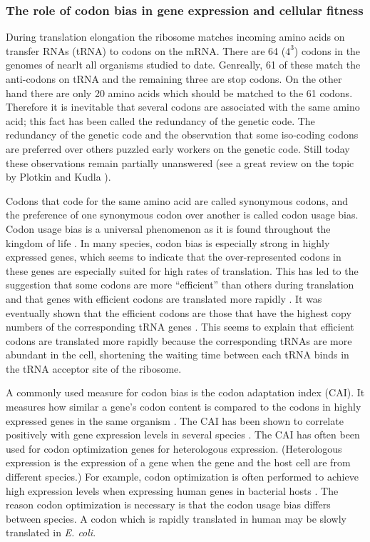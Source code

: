 \subsubsection{The role of codon bias in gene expression and cellular fitness}
During translation elongation the ribosome matches incoming amino acids on
transfer RNAs (tRNA) to codons on the mRNA. There are 64 ($4^3$) codons in the
genomes of nearlt all organisms studied to date. Genreally, 61 of these match
the anti-codons on tRNA and the remaining three are stop codons. On the other
hand there are only 20 amino acids which should be matched to the 61 codons.
Therefore it is inevitable that several codons are associated with the same
amino acid; this fact has been called the redundancy of the genetic code. The
redundancy of the genetic code and the observation that some iso-coding codons
are preferred over others puzzled early workers on the genetic code. Still
today these observations remain partially unanswered (see a great review on the
topic by Plotkin and Kudla \cite{plotkin_synonymous_2011}).

Codons that code for the same amino acid are called synonymous codons, and the
preference of one synonymous codon over another is called codon usage bias.
Codon usage bias is a universal phenomenon as it is found throughout the
kingdom of life \cite{sharp_codon_1988}. In many species, codon bias is
especially strong in highly expressed genes, which seems to indicate that the
over-represented codons in these genes are especially suited for high rates of
translation.  This has led to the suggestion that some codons are more
``efficient'' than others during translation and that genes with efficient
codons are translated more rapidly \cite{moriyama_gene_1998}. It was eventually
shown that the efficient codons are those that have the highest copy numbers of
the corresponding tRNA genes \cite{reis_solving_2004, elf_selective_2003}. This
seems to explain that efficient codons are translated more rapidly because the
corresponding tRNAs are more abundant in the cell, shortening the waiting time
between each tRNA binds in the tRNA acceptor site of the ribosome.

A commonly used measure for codon bias is the codon adaptation index (CAI). It
measures how similar a gene's codon content is compared to the codons in highly
expressed genes in the same organism \cite{sharp_codon_1987}. The CAI has been
shown to correlate positively with gene expression levels in several species
\cite{duret_expression_1999, jansen_revisiting_2003}. The CAI has often been
used for codon optimization genes for heterologous expression. (Heterologous
expression is the expression of a gene when the gene and the host cell are from
different species.) For example, codon optimization is often performed to
achieve high expression levels when expressing human genes in bacterial hosts
\cite{gustafsson_codon_2004}. The reason codon optimization is necessary is
that the codon usage bias differs between species. A codon which is rapidly
translated in human may be slowly translated in \textit{E. coli}.


